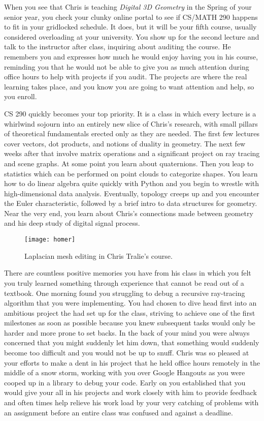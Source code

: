 \documentclass[../main.tex]{subfiles}
\begin{document}
When you see that Chris is teaching \textit{Digital 3D Geometry} in the Spring of your senior year, you check your clunky online portal to see if CS/MATH 290 happens to fit in your gridlocked schedule. It does, but it will be your fifth course, usually considered overloading at your university. You show up for the second lecture and talk to the instructor after class, inquiring about auditing the course. He remembers you and expresses how much he would enjoy having you in his course, reminding you that he would not be able to give you as much attention during office hours to help with projects if you audit. The projects are where the real learning takes place, and you know you are going to want attention and help, so you enroll.

CS 290 quickly becomes your top priority. It is a class in which every lecture is a whirlwind sojourn into an entirely new slice of Chris's research, with small pillars of theoretical fundamentals erected only as they are needed. The first few lectures cover vectors, dot products, and notions of duality in geometry. The next few weeks after that involve matrix operations and a significant project on ray tracing and scene graphs. At some point you learn about quaternions. Then you leap to statistics which can be performed on point clouds to categorize shapes. You learn how to do linear algebra quite quickly with Python and you begin to wrestle with high-dimensional data analysis. Eventually, topology creeps up and you encounter the Euler characteristic, followed by a brief intro to data structures for geometry. Near the very end, you learn about Chris's connections made between geometry and his deep study of digital signal process.

\begin{figure}[h!]
	\centering
	\texttt{[image: homer]}
	\caption*{Laplacian mesh editing in Chris Tralie's course.}
\end{figure}

There are countless positive memories you have from his class in which you felt you truly learned something through experience that cannot be read out of a textbook. One morning found you struggling to debug a recursive ray-tracing algorithm that you were implementing. You had chosen to dive head first into an ambitious project the had set up for the class, striving to achieve one of the first milestones as soon as possible because you knew subsequent tasks would only be harder and more prone to set backs. In the back of your mind you were always concerned that you might suddenly let him down, that something would suddenly become too difficult and you would not be up to snuff. Chris was so pleased at your efforts to make a dent in his project that he held office hours remotely in the middle of a snow storm, working with you over Google Hangouts as you were cooped up in a library to debug your code. Early on you established that you would give your all in his projects and work closely with him to provide feedback and often times help relieve his work load by your very catching of problems with an assignment before an entire class was confused and against a deadline. 
\end{document}
